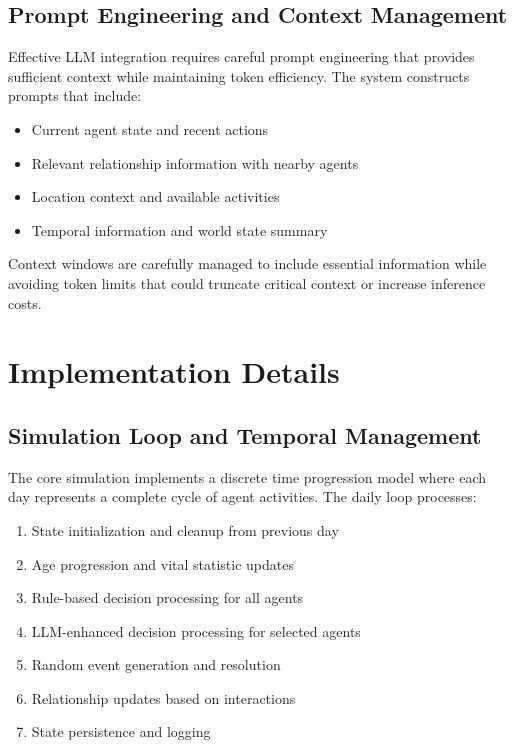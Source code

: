 \documentclass[conference]{IEEEtran}
\begin{document}
\subsection{Prompt Engineering and Context Management}

Effective LLM integration requires careful prompt engineering that provides sufficient context while maintaining token efficiency. The system constructs prompts that include:

\begin{itemize}
\item Current agent state and recent actions
\item Relevant relationship information with nearby agents
\item Location context and available activities
\item Temporal information and world state summary
\end{itemize}

Context windows are carefully managed to include essential information while avoiding token limits that could truncate critical context or increase inference costs.

\section{Implementation Details}

\subsection{Simulation Loop and Temporal Management}

The core simulation implements a discrete time progression model where each day represents a complete cycle of agent activities. The daily loop processes:

\begin{enumerate}
\item State initialization and cleanup from previous day
\item Age progression and vital statistic updates
\item Rule-based decision processing for all agents
\item LLM-enhanced decision processing for selected agents
\item Random event generation and resolution
\item Relationship updates based on interactions
\item State persistence and logging
\end{enumerate}
\end{document}
